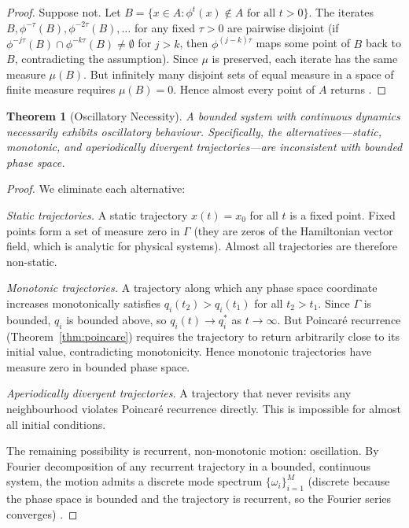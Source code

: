 \documentclass[11pt,a4paper]{article}
\newtheorem{theorem}{Theorem}[section]
\theoremstyle{definition}
\theoremstyle{remark}
\begin{document}
\begin{proof}
Suppose not. Let $B = \{x \in A : \phi^t(x) \notin A \text{ for all } t > 0\}$. The iterates $B, \phi^{-\tau}(B), \phi^{-2\tau}(B), \ldots$ for any fixed $\tau > 0$ are pairwise disjoint (if $\phi^{-j\tau}(B) \cap \phi^{-k\tau}(B) \neq \emptyset$ for $j > k$, then $\phi^{(j-k)\tau}$ maps some point of $B$ back to $B$, contradicting the assumption). Since $\mu$ is preserved, each iterate has the same measure $\mu(B)$. But infinitely many disjoint sets of equal measure in a space of finite measure requires $\mu(B) = 0$. Hence almost every point of $A$ returns \citep{poincare1890, arnold1989}.
\end{proof}

\begin{theorem}[Oscillatory Necessity]
\label{thm:oscillatory}
A bounded system with continuous dynamics necessarily exhibits oscillatory behaviour. Specifically, the alternatives---static, monotonic, and aperiodically divergent trajectories---are inconsistent with bounded phase space.
\end{theorem}

\begin{proof}
We eliminate each alternative:

\emph{Static trajectories.} A static trajectory $x(t) = x_0$ for all $t$ is a fixed point. Fixed points form a set of measure zero in $\Gamma$ (they are zeros of the Hamiltonian vector field, which is analytic for physical systems). Almost all trajectories are therefore non-static.

\emph{Monotonic trajectories.} A trajectory along which any phase space coordinate increases monotonically satisfies $q_i(t_2) > q_i(t_1)$ for all $t_2 > t_1$. Since $\Gamma$ is bounded, $q_i$ is bounded above, so $q_i(t) \to q_i^*$ as $t \to \infty$. But Poincar{\'e} recurrence (Theorem~\ref{thm:poincare}) requires the trajectory to return arbitrarily close to its initial value, contradicting monotonicity. Hence monotonic trajectories have measure zero in bounded phase space.

\emph{Aperiodically divergent trajectories.} A trajectory that never revisits any neighbourhood violates Poincar{\'e} recurrence directly. This is impossible for almost all initial conditions.

The remaining possibility is recurrent, non-monotonic motion: oscillation. By Fourier decomposition of any recurrent trajectory in a bounded, continuous system, the motion admits a discrete mode spectrum $\{\omega_i\}_{i=1}^M$ (discrete because the phase space is bounded and the trajectory is recurrent, so the Fourier series converges) \citep{arnold1989}.
\end{proof}
\end{document}
